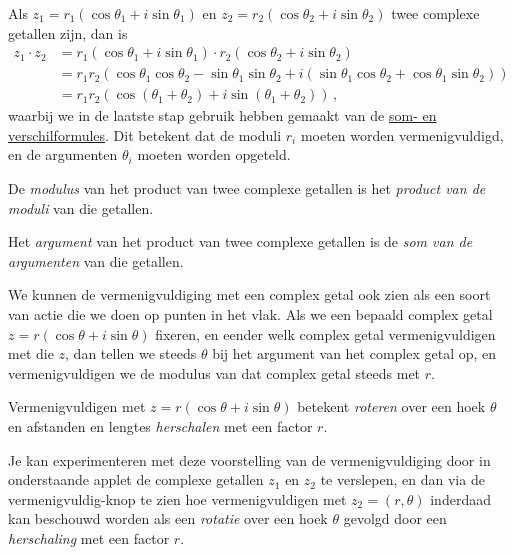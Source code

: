 \documentclass{ximera}
\begin{document}
Als $z_1=r_1 (\cos \theta_1 + i \sin \theta_1 ) $ en $z_2 = r_2(\cos \theta_2 + i \sin \theta_2 )$ twee complexe getallen zijn, dan is
\begin{align*}
z_1\cdot z_2 &= r_1 (\cos \theta_1 + i \sin \theta_1 )\cdot r_2 (\cos\theta_2 + i \sin \theta_2 )\\
             &= r_1 r_2 (\cos \theta_1 \cos \theta_2 - \sin \theta_1  \sin\theta_2 + i(\sin \theta_1 \cos \theta_2 + \cos \theta_1  \sin
\theta_2 ))\\
             &= r_1 r_2 ( \cos(\theta_1 + \theta_2) + i \sin(\theta_1 + \theta_2)) \, ,
\end{align*}
waarbij we in de laatste stap gebruik hebben gemaakt van de \hyperref[xim:goniometrie_formules]{som- en verschilformules}.
Dit betekent dat de moduli $r_i$ moeten worden vermenigvuldigd, en de argumenten $\theta_i$ moeten worden opgeteld.
 
\begin{proposition}\label{eig:vermenigvuldiging_complexe_getallen}\nl
     
De \textit{modulus} van het product van twee complexe getallen is het \textit{product van de moduli} van die getallen.
 
Het \textit{argument} van het product van twee complexe getallen is de \textit{som van de argumenten} van die getallen.
\end{proposition}
 
\begin{xmuitweiding}
We kunnen de vermenigvuldiging met een complex getal ook zien als een soort van actie die we doen op punten in het vlak. Als we een bepaald complex getal $z = r(\cos\theta + i \sin \theta)$ fixeren, en eender welk complex getal vermenigvuldigen met die $z$, dan tellen we steeds $\theta$ bij het argument van het complex getal op, en vermenigvuldigen we de modulus van dat complex getal steeds met $r$.
 
\begin{proposition}[Vermenigvuldiging met een complex getal in goniometrische schrijfwijze $z=r(\cos\theta + i\sin\theta)$]\nl
     
Vermenigvuldigen met $z = r(\cos\theta + i\sin\theta)$ betekent \textit{roteren} over een hoek $\theta$ en afstanden en lengtes \textit{herschalen} met een factor $r$.
\end{proposition}
 
Je kan experimenteren met deze voorstelling van de vermenigvuldiging door in onderstaande applet de complexe getallen $z_1$ en $z_2$ te verslepen, en dan via de vermenigvuldig-knop te zien hoe vermenigvuldigen met $z_2 = (r,\theta)$ inderdaad kan beschouwd worden als een \textit{rotatie} over een hoek $\theta$ gevolgd door een \textit{herschaling} met een factor $r$.
 
\end{xmuitweiding}
 
\end{document}

